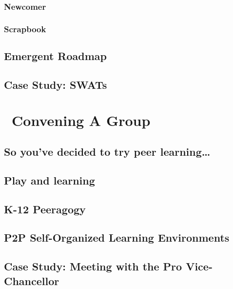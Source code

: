 \documentclass[ebook,12pt, twoside]{memoir}
\begin{document}
\section{Newcomer} \label{sec:Newcomer}

%
\section{Scrapbook} \label{sec:Scrapbook}




\chapter{Emergent Roadmap} \label{sec:Distributed_Roadmap}
 

\renewcommand*{\footnote}[1]{\oldfootnote{#1}}%
\renewcommand*{\textsuperscript}[1]{\oldtextsuperscript{#1}}%

\chapter{Case Study: SWATs} \label{swats}


\part{~Convening A Group} \label{convening-part} %
%
\chapter[\textbf{So you've decided to try peer learning\ldots}]{So you've decided to try peer learning\ldots}

%
\chapter[\textbf{Play and learning}]{Play and learning}
%

%
\chapter[\textbf{K-12 Peeragogy}]{K-12 Peeragogy}
%

%
\chapter[\textbf{P2P SOLE}]{P2P Self-Organized Learning Environments}
%

%
\chapter[\textbf{Case Study: Meeting with the PVC}]{ Case Study: Meeting with the Pro Vice-Chancellor}
%

\end{document}
